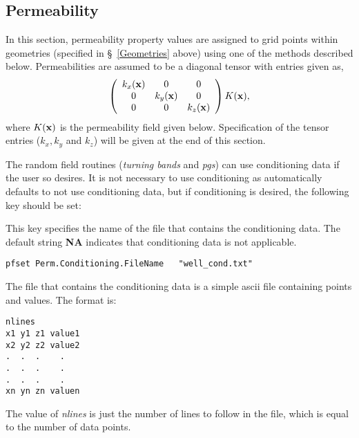 
\subsection{Permeability}
\label{Permeability}

In this section, permeability property values are assigned to grid
points within geometries (specified in \S~\ref{Geometries} above)
using one of the methods described below.  Permeabilities are assumed to be a
diagonal tensor with entries given as,
\[ 
\left( 
\begin{array}{ccc}
k_x({\bf x}) & 0 & 0 \\
0 & k_y({\bf x}) & 0 \\
0 & 0 & k_z({\bf x}) 
\end{array} \right) 
K({\bf x}),
\]
where $K({\bf x})$ is the permeability field given below.  Specification of the
tensor entries ($k_x, k_y$ and $k_z$) will be given at the end of this section.

The random field routines ({\em turning bands} and {\em pgs}) can use
conditioning data if the user so desires.  It is not necessary to use
conditioning as
\parflow{} automatically defaults to not use conditioning data, but
if conditioning is desired, the following key should be set:

{
This key specifies the name of the file that contains the conditioning
data.  The default string {\bf NA} indicates that conditioning data is
not applicable.
}
\begin{display}\begin{verbatim}
pfset Perm.Conditioning.FileName   "well_cond.txt"
\end{verbatim}\end{display}

The file that contains the conditioning data is a simple ascii file
containing points and values. The format is:

\begin{display}\begin{verbatim}
nlines
x1 y1 z1 value1
x2 y2 z2 value2
.  .  .    .
.  .  .    .
.  .  .    .
xn yn zn valuen
\end{verbatim}\end{display}

The value of {\em nlines} is just the number
of lines to follow in the file, which 
is equal to the number of data points.

